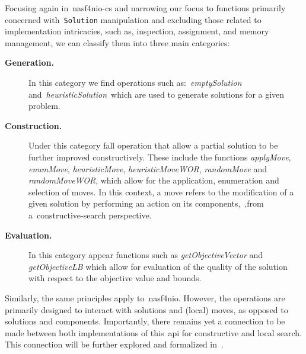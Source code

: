 Focusing again in~\acrshort{nasf4nio-cs} and narrowing our focus to functions
primarily concerned with~\texttt{Solution} manipulation and excluding those related to
implementation intricacies, such as, inspection, assignment, and memory management,
we can classify them into three main categories:

\begin{description}
  \item[\textbf{Generation.}] In this category we find operations such
    as:~\textit{emptySolution} and~\textit{heuristicSolution}~which are used to
    generate solutions for a given problem.
  \item[\textbf{Construction.}] Under this category fall operation that
    allow a partial solution to be further improved constructively.
    These include the functions \textit{applyMove}, \textit{enumMove},
    \textit{heuristicMove}, \textit{heuristicMoveWOR},
    \textit{randomMove} and \textit{randomMoveWOR}, which allow for the
    application, enumeration and selection of moves.  In this context, a
    move refers to the modification of a given solution by performing an
    action on its components,~\ie{},from
    a~\acrshort{constructive-search} perspective.
  \item[\textbf{Evaluation.}] In this category appear functions such as
    \textit{getObjectiveVector} and \textit{getObjectiveLB} which allow for
    evaluation of the quality of the solution with respect to the objective
    value and bounds.
\end{description}

Similarly, the same principles apply to~\acrshort{nasf4nio}. However, the
 operations are primarily designed to interact with
solutions and (local) moves, as opposed to solutions and components.
Importantly, there remains yet a connection to be made between both
implementations of this~\acrshort{api} for constructive and local search. This
connection will be further explored and formalized in~.